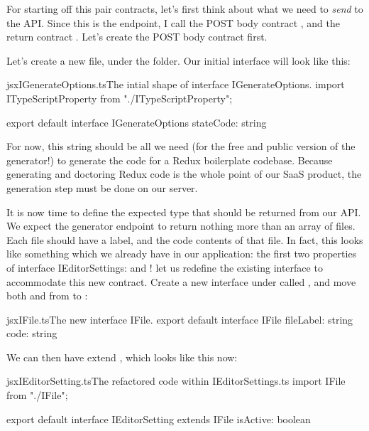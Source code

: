 \documentclass[a4paper,headinclude=on,footinclude=on,12pt,oneside]{scrbook}
\begin{document}
For starting off this pair contracts, let's first think about what we need to \textit{send} to the API. Since this is the  endpoint, I call the POST body contract , and the return contract . Let's create the POST body contract first.


Let's create a new file,  under the  folder. Our initial  interface will look like this:

\begin{codeInput}{jsx}{IGenerateOptions.ts}{The intial shape of interface IGenerateOptions.}
import ITypeScriptProperty from "./ITypeScriptProperty";

export default interface IGenerateOptions {
  stateCode: string
}
\end{codeInput}

For now, this  string should be all we need (for the free and public version of the generator!) to generate the code for a Redux boilerplate codebase. Because generating and doctoring Redux code is the whole point of our SaaS product, the generation step must be done on our server.

It is now time to define the expected type that should be returned from our API. We expect the generator endpoint to return nothing more than an array of files. Each file should have a label, and the code contents of that file. In fact, this looks like something which we already have in our application: the first two properties of interface {IEditorSettings}:  and ! let us redefine the existing  interface to accommodate this new contract. Create a new interface under  called , and move both  and  from  to :

\begin{codeInput}{jsx}{IFile.ts}{The new interface IFile.}
export default interface IFile { 
  fileLabel: string
  code: string
}
\end{codeInput}

We can then have  extend , which looks like this now:

\begin{codeInput}{jsx}{IEditorSetting.ts}{The refactored code within IEditorSettings.ts}
import IFile from "./IFile";

export default interface IEditorSetting extends IFile {
  isActive: boolean
}  
\end{codeInput}
\end{document}
